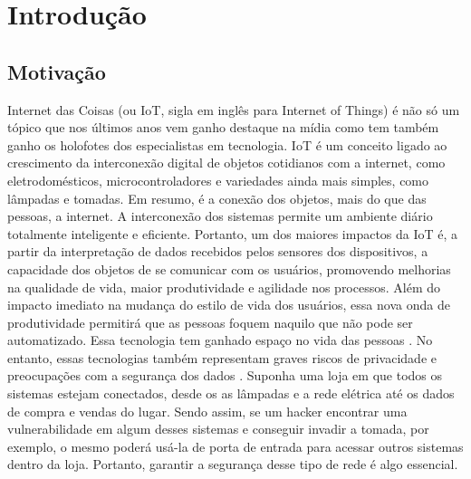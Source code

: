 \section{Introdução}
\subsection{Motivação}
	Internet das Coisas (ou IoT, sigla em inglês para Internet of Things) é não só um tópico que nos últimos anos vem ganho destaque na mídia como tem também ganho os holofotes dos especialistas em tecnologia. IoT é um conceito ligado ao crescimento da interconexão digital de objetos cotidianos com a internet, como eletrodomésticos, microcontroladores e variedades ainda mais simples, como lâmpadas e tomadas. Em resumo, é a conexão dos objetos, mais do que das pessoas, a internet. A interconexão dos sistemas permite um ambiente diário totalmente inteligente e eficiente. Portanto, um dos maiores impactos da IoT é, a partir da interpretação de dados recebidos pelos sensores dos dispositivos, a capacidade dos objetos de se comunicar com os usuários, promovendo melhorias na qualidade de vida, maior produtividade e agilidade nos processos. Além do impacto imediato na mudança do estilo de vida dos usuários, essa nova onda de produtividade permitirá que as pessoas foquem naquilo que não pode ser automatizado.
	Essa tecnologia tem ganhado espaço no vida das pessoas \cite{fan2018blockchain}. No entanto, essas tecnologias também representam graves riscos de privacidade e preocupações com a segurança dos dados \cite{dwivedi2019decentralized}. Suponha uma loja em que todos os sistemas estejam conectados, desde os as lâmpadas e a rede elétrica até os dados de compra e vendas do lugar. Sendo assim, se um hacker encontrar uma vulnerabilidade em algum desses sistemas e conseguir invadir a tomada, por exemplo, o mesmo poderá usá-la de porta de entrada para acessar outros sistemas dentro da loja. Portanto, garantir a segurança desse tipo de rede é algo essencial.


